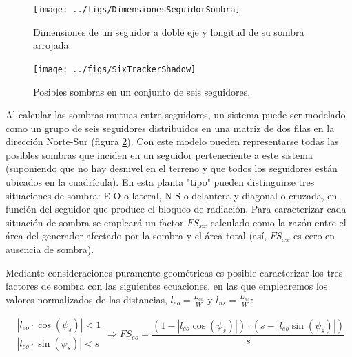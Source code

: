 %
\begin{figure}
\begin{centering}
\texttt{[image: ../figs/DimensionesSeguidorSombra]}
\end{centering}

\caption{\label{fig:DimensionesSeguidorSombra}Dimensiones de un seguidor a
doble eje y longitud de su sombra arrojada.}

\end{figure}


%
\begin{figure}
\begin{centering}
\texttt{[image: ../figs/SixTrackerShadow]}
\end{centering}

\caption{\label{fig:SeisSeguidores}Posibles sombras en un conjunto de seis
seguidores.}

\end{figure}


Al calcular las sombras mutuas entre seguidores, un sistema puede ser
modelado como un grupo de seis seguidores distribuidos en una matriz
de dos filas en la dirección Norte-Sur (figura
\ref{fig:SeisSeguidores}).  Con este modelo pueden representarse todas
las posibles sombras que inciden en un seguidor perteneciente a este
sistema (suponiendo que no hay desnivel en el terreno y que todos los
seguidores están ubicados en la cuadrícula).  En esta planta "tipo"
pueden distinguirse tres situaciones de sombra: E-O o lateral, N-S o
delantera y diagonal o cruzada, en función del seguidor que produce el
bloqueo de radiación.  Para caracterizar cada situación de sombra se
empleará un factor $FS_{xx}$ calculado como la razón entre el área del
generador afectado por la sombra y el área total (así, $FS_{xx}$ es
cero en ausencia de sombra).  
  

Mediante consideraciones puramente geométricas es posible caracterizar 
los tres factores de sombra con las siguientes ecuaciones, en las que
emplearemos los valores normalizados de las distancias,
$l_{eo}=\frac{L_{eo}}{W}$ y $l_{ns}=\frac{L_{ns}}{W}$:

\begin{equation}
\begin{array}{c}
|l_{eo}\cdot\cos(\psi_{s})|<1\\
|l_{eo}\cdot\sin(\psi_{s})|<s\end
{array}
\Rightarrow
FS_{eo}=\frac{(1-|l_{eo}\cos(\psi_{s})|)\cdot(s-|l_{eo}\sin(\psi_{s})|)}{s}
\end{equation}


